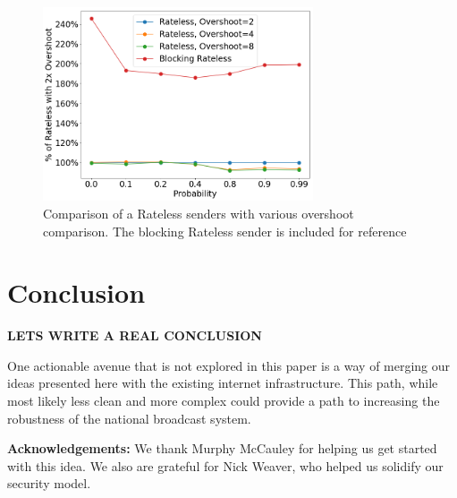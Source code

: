 \begin{figure}[tp]
\centering
\noindent
\includegraphics[width=8cm]{figures/FACTOR_VARY.png}
\caption{Comparison of a Rateless senders with various overshoot comparison. The blocking Rateless sender is included for reference}
\label{graph:varyParams}
\end{figure}




\section{Conclusion}
\textbf{LETS WRITE A REAL CONCLUSION}


One actionable avenue that is not explored in this paper is a way of merging our ideas presented here with the existing internet infrastructure. This path, while most likely less clean and more complex could provide a path to  increasing the robustness of the national broadcast system.


\textbf{Acknowledgements:} We thank Murphy McCauley for helping us get started with this idea. We also are grateful for Nick Weaver, who helped us solidify our security model.



